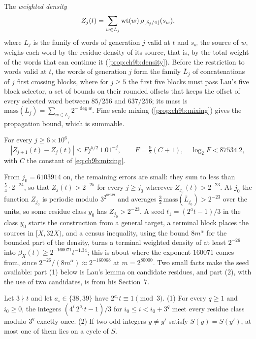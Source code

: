 The \emph{weighted density}
\[
  Z_j(t)=\sum_{w\in L_j}\operatorname{wt}(w)\,\rho_{\lfloor\delta_j/4\rfloor}(s_w),
\]
where $L_j$ is the family of words of generation $j$ valid at $t$ and $s_w$ the source of $w$, weighs each word by the residue density of its source, that is, by the total weight of the words that can continue it (\cref{prop:ch9b:density}). Before the restriction to words valid at $t$, the words of generation $j$ form the family $\bar L_j$ of concatenations of $j$ first crossing blocks, where for $j\ge5$ the first five blocks must pass Lau's five block selector, a set of bounds on their rounded offsets that keeps the offset of every selected word between $85/256$ and $637/256$; its mass is $\mathrm{mass}(\bar L_j)=\sum_{w\in\bar L_j}2^{-\deg w}$. Fine scale mixing (\cref{prop:ch9b:mixing}) gives the propagation bound, which is summable.

\begin{proposition}\label{prop:ch9b:propagation}
For every $j\ge6\times10^6$,
\[
  |Z_{j+1}(t)-Z_j(t)|\le Fj^{5/2}\,1.01^{-j},\qquad F=\tfrac92(C+1),\quad\log_2F<87534.2,
\]
with $C$ the constant of \eqref{eq:ch9b:mixing}.
\end{proposition}

From $j_0=6103914$ on, the remaining errors are small: they sum to less than $\frac54\cdot2^{-24}$, so that $Z_j(t)>2^{-25}$ for every $j\ge j_0$ wherever $Z_{j_0}(t)>2^{-23}$. At $j_0$ the function $Z_{j_0}$ is periodic modulo $3^{2^{87639}}$ and averages $\frac32\,\mathrm{mass}(\bar L_{j_0})>2^{-23}$ over the units, so some residue class $y_0$ has $Z_{j_0}>2^{-23}$. A seed $t_1=(2^at-1)/3$ in the class $y_0$ starts the construction from a general target, a terminal block places the sources in $[X,32X)$, and a census inequality, using the bound $8m^\alpha$ for the bounded part of the density, turns a terminal weighted density of at least $2^{-26}$ into $\beta_X(t)\ge2^{-160071}t^{-1.34}$; this is about where the exponent $160071$ comes from, since $2^{-26}/(8m^\alpha)\approx2^{-160068}$ at $m=2^{80000}$. Two small facts make the seed available: part (1) below is Lau's lemma on candidate residues, and part (2), with the use of two candidates, is from his Section~7.

\begin{lemma}\label{lem:ch9b:seed}
Let $3\nmid t$ and let $a_\circ\in\{38,39\}$ have $2^{a_\circ}t\equiv1\pmod3$. (1) For every $q\ge1$ and $i_0\ge0$, the integers $(4^{i}\,2^{a_\circ}t-1)/3$ for $i_0\le i<i_0+3^{q}$ meet every residue class modulo $3^{q}$ exactly once. (2) If two odd integers $y\ne y'$ satisfy $S(y)=S(y')$, at most one of them lies on a cycle of $S$.
\end{lemma}

